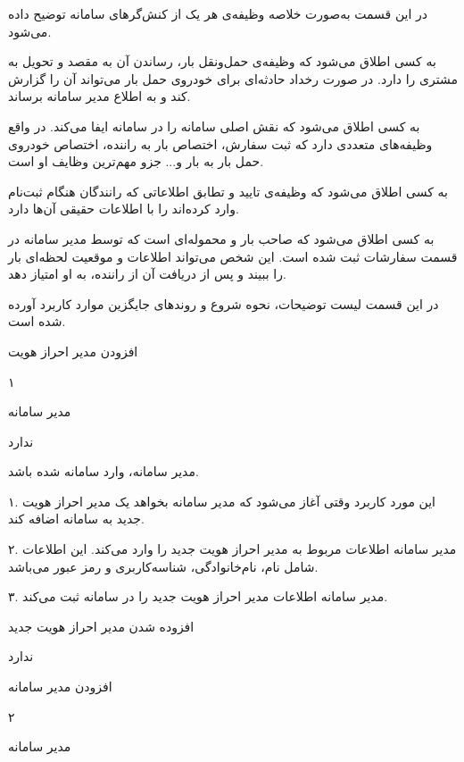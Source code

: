 \newpage
{}
در این قسمت به‌صورت خلاصه وظیفه‌ی هر یک از  کنش‌گرهای سامانه توضیح داده می‌شود.

 به کسی اطلاق می‌شود که وظیفه‌ی حمل‌ونقل بار، رساندن آن به مقصد و تحویل به مشتری را دارد. در صورت رخداد حادثه‌ای برای خودروی حمل بار می‌تواند آن را گزارش کند و به اطلاع مدیر سامانه برساند.

به کسی اطلاق می‌شود که نقش اصلی سامانه را در سامانه ایفا می‌کند. در واقع وظیفه‌های متعددی دارد که ثبت سفارش، اختصاص بار به راننده، اختصاص خودروی حمل بار به بار و... جزو مهم‌ترین وظایف او است.

به کسی اطلاق می‌شود که وظیفه‌ی تایید و تطابق اطلاعاتی که رانندگان هنگام ثبت‌نام وارد کرده‌اند را با اطلاعات حقیقی آن‌ها دارد.

به کسی اطلاق می‌شود که صاحب بار و محموله‌ای است که توسط مدیر سامانه در قسمت سفارشات ثبت شده است. این شخص می‌تواند اطلاعات و موقعیت لحظه‌ای بار را ببیند و پس از دریافت آن از راننده، به او امتیاز دهد.


\newpage
{}

 در این قسمت لیست توضیحات، نحوه شروع و  روندهای جایگزین موارد کاربرد آورده شده است.

افزودن مدیر احراز هویت

۱

مدیر سامانه

ندارد

مدیر سامانه، وارد سامانه شده باشد.


۱. این مورد کاربرد وقتی آغاز می‌شود که مدیر سامانه بخواهد یک مدیر احراز هویت جدید به سامانه اضافه کند.

۲. مدیر سامانه اطلاعات مربوط به مدیر احراز هویت جدید را وارد می‌کند. این اطلاعات شامل نام، نام‌خانوادگی، شناسه‌کاربری و  رمز عبور می‌باشد.

۳. مدیر سامانه اطلاعات مدیر احراز هویت جدید را در سامانه ثبت می‌کند.

افزوده شدن مدیر احراز هویت جدید

ندارد

\newpage

افزودن مدیر سامانه

۲

مدیر سامانه

